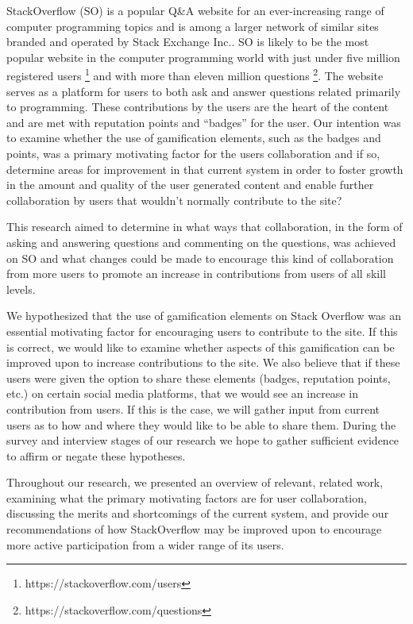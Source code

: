 \documentclass{sigchi}
\begin{document}
StackOverflow (SO) is a popular Q\&A website for an ever-increasing range of computer programming topics and is among a larger network of similar sites branded and operated by Stack Exchange Inc.. SO is likely to be the most popular website in the computer programming world with just under five million registered users \footnote{https://stackoverflow.com/users} and with more than eleven million questions \footnote{https://stackoverflow.com/questions}. The website serves as a platform for users to both ask and answer questions related primarily to programming. These contributions by the users are the heart of the content and are met with reputation points and “badges” for the user. Our intention was to examine whether the use of gamification elements, such as the badges and points, was a primary motivating factor for the users collaboration and if so, determine areas for improvement in that current system in order to foster growth in the amount and quality of the user generated content and enable further collaboration by users that wouldn't normally contribute to the site?

This research aimed to determine in what ways that collaboration, in the form of asking and answering questions and commenting on the questions, was achieved on SO and what changes could be made to encourage this kind of collaboration from more users to promote an increase in contributions from users of all skill levels.

We hypothesized that the use of gamification elements on Stack Overflow was an essential motivating factor for encouraging users to contribute to the site. If this is correct, we would like to examine whether aspects of this gamification can be improved upon to increase contributions to the site. We also believe that if these users were given the option to share these elements (badges, reputation points, etc.) on certain social media platforms, that we would see an increase in contribution from users. If this is the case, we will gather input from current users as to how and where they would like to be able to share them. During the survey and interview stages of our research we hope to gather sufficient evidence to affirm or negate these hypotheses.

Throughout our research, we presented an overview of relevant, related work, examining what the primary motivating factors are for user collaboration, discussing the merits and shortcomings of the current system, and provide our recommendations of how StackOverflow may be improved upon to encourage more active participation from a wider range of its users.
\end{document}
